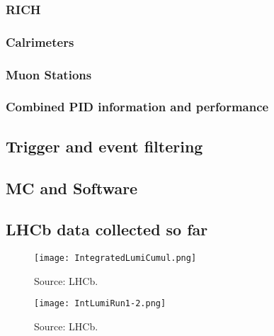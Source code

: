 \subsubsection{RICH}
\subsubsection{Calrimeters}
\subsubsection{Muon Stations}
\subsubsection{Combined PID information and performance}

\subsection{Trigger and event filtering}

\subsection{MC and Software}

\subsection{LHCb data collected so far}

\begin{figure}[tb] 
  \centering    
  \texttt{[image: IntegratedLumiCumul.png]}
  \caption{Source: LHCb.}
  \label{fig:cumulative_lumi}
\end{figure}

\begin{figure}[tb] 
  \centering    
  \texttt{[image: IntLumiRun1-2.png]}
  \caption{Source: LHCb.}
  \label{fig:yearly_lumi}
\end{figure}
